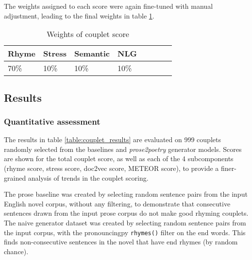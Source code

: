 \documentclass[11pt,a4paper]{article}
\begin{document}
The weights assigned to each score were again fine-tuned with manual adjustment, leading to the final weights in table \ref{table:weight_couplet_score}.

\begin{table}[ht]
\centering
\begin{tabular}{llll c c c c}
	\hline\hline
	Rhyme & Stress & Semantic & NLG \\ [0.5ex]
	\hline
	70\% & 10\% & 10\% & 10\% \\ [0.5ex]
	\hline
\end{tabular}
\caption{Weights of couplet score}
\label{table:weight_couplet_score}
\end{table}

\subsection{Results}
\label{sec:results}
\subsubsection{Quantitative assessment}

The results in table \ref{table:couplet_results} are evaluated on 999 couplets randomly selected from the baselines and \textit{prose2poetry} generator models. Scores are shown for the total couplet score, as well as each of the 4 subcomponents (rhyme score, stress score, doc2vec score, METEOR score), to provide a finer-grained analysis of trends in the couplet scoring.

The prose baseline was created by selecting random sentence pairs from the input English novel corpus, without any filtering, to demonstrate that consecutive sentences drawn from the input prose corpus do not make good rhyming couplets. The naive generator dataset was created by selecting random sentence pairs from the input corpus, with the pronouncingpy \verb|rhymes()| filter on the end words. This finds non-consecutive sentences in the novel that have end rhymes (by random chance).
\end{document}
